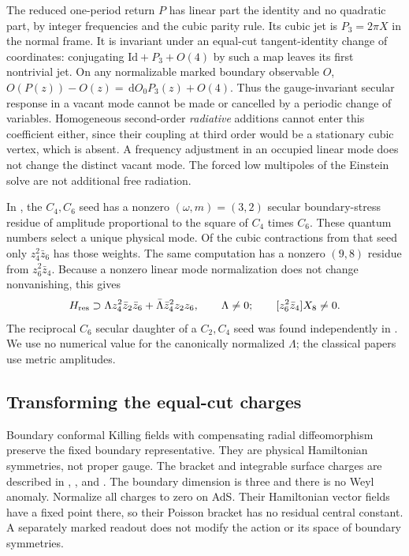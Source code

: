 \documentclass[11pt]{article}
\newcommand{\dd}{\,\mathrm d}
\numberwithin{equation}{section}
\begin{document}
The reduced one-period return \(P\) has linear part the
identity and no quadratic part, by integer frequencies and the
cubic parity rule. Its cubic jet is \(P_3=2\pi X\) in the
normal frame. It is invariant under an equal-cut tangent-identity
change of coordinates: conjugating
\(\mathrm{Id}+P_3+O(4)\) by such a map leaves its first
nontrivial jet. On any normalizable marked boundary observable
\(O\), \(O(P(z))-O(z)=\dd O_0 P_3(z)+O(4)\).
Thus the gauge-invariant secular response in a vacant mode
cannot be made or cancelled by a periodic change of variables.
Homogeneous second-order \emph{radiative} additions cannot
enter this coefficient either, since their coupling at
third order would be a stationary cubic vertex, which is absent.
A frequency adjustment in an occupied linear mode does not
change the distinct vacant mode. The forced low multipoles of
the Einstein solve are not additional free radiation.

In \cite[Eqs.~(124), (132), (134), arXiv v1]{ds}, the \(C_4,C_6\)
seed has a nonzero \((\omega,m)=(3,2)\) secular boundary-stress
residue of amplitude proportional to the square of \(C_4\) times
\(C_6\). These quantum numbers select a unique physical mode.
Of the cubic contractions from that seed only \(z_4^2\bar z_6\)
has those weights. The same computation has a nonzero \((9,8)\)
residue from \(z_6^2\bar z_4\). Because a nonzero linear mode
normalization does not change nonvanishing, this gives
\begin{equation}\label{eq:inputs}
 H_{\rm res}\supset
 \Lambda z_4^2\bar z_2\bar z_6+\bar\Lambda\bar z_4^2z_2z_6,
 \qquad \Lambda\ne0;\qquad
 [z_6^2\bar z_4]X_8\ne0 .
\end{equation}
The reciprocal \(C_6\) secular daughter of a \(C_2,C_4\) seed was
found independently in \cite[discussion around Eq.~(8)]{dhs}.
We use no numerical value for the canonically normalized
\(\Lambda\); the classical papers use metric amplitudes.

\subsection{Transforming the equal-cut charges}

Boundary conformal Killing fields with compensating radial
diffeomorphism preserve the fixed boundary representative.
They are physical Hamiltonian symmetries, not proper gauge.
The bracket and integrable surface charges are described in
\cite[Secs.~2.2--2.3]{him}, \cite[Secs.~4.1--4.3]{ps}, and
\cite[Sec.~3.1]{cm}. The boundary dimension is three and there
is no Weyl anomaly. Normalize all charges to zero on AdS.
Their Hamiltonian vector fields have a fixed point there, so
their Poisson bracket has no residual central constant.
A separately marked readout does not modify the action or its
space of boundary symmetries.
\end{document}
